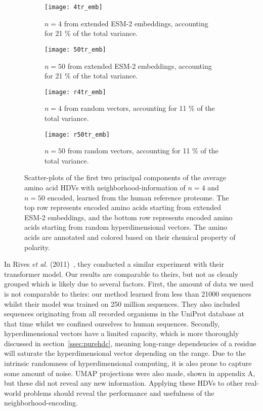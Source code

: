 \begin{figure}[H]
    \label{fig:bigfig}
    \centering
    \begin{subfigure}[b]{0.45\textwidth}
        \texttt{[image: 4tr\_emb]}
        \caption{$n = 4$ from extended ESM-2 embeddings, accounting for 21 \% of the total variance.}
        \label{fig:AAtr4}
    \end{subfigure}
    \hfill
    \begin{subfigure}[b]{0.45\textwidth}
        \texttt{[image: 50tr\_emb]}
        \caption{$n = 50$ from extended ESM-2 embeddings, accounting for 21 \% of the total variance.}
        \label{fig:AAtr50}
    \end{subfigure}
    \vspace{10pt} %
    \begin{subfigure}[b]{0.45\textwidth}
        \texttt{[image: r4tr\_emb]}
        \caption{$n = 4$ from random vectors, accounting for 11 \% of the total variance.}
        \label{fig:AArtr4}
    \end{subfigure}
    \hfill
    \begin{subfigure}[b]{0.45\textwidth}
        \texttt{[image: r50tr\_emb]}
        \caption{$n = 50$ from random vectors, accounting for 11 \% of the total variance.}
        \label{fig:AArtr50}
    \end{subfigure}
    \caption{Scatter-plots of the first two principal components of the average amino acid HDVs with neighborhood-information of $n = 4$ and $n = 50$ encoded, learned from the human reference proteome. The top row represents encoded amino acids starting from extended ESM-2 embeddings, and the bottom row represents encoded amino acids starting from random hyperdimensional vectors. The amino acids are annotated and colored based on their chemical property of polarity.}
\end{figure}

In Rives \textit{et al.} (2011)~\cite{esm1}, they conducted a similar experiment with their transformer model. Our results are comparable to theirs, but not as cleanly grouped which is likely due to several factors. First, the amount of data we used is not comparable to theirs: our method learned from less than 21000 sequences whilst their model was trained on 250 million sequences. They also included sequences originating from all recorded organisms in the UniProt database at that time whilst we confined ourselves to human sequences. Secondly, hyperdimensional vectors have a limited capacity, which is more thoroughly discussed in section~\ref{ssec:purehdc}, meaning long-range dependencies of a residue will saturate the hyperdimensional vector depending on the range. Due to the intrinsic randomness of hyperdimensional computing, it is also prone to capture some amount of noise. UMAP projections were also made, shown in appendix A, but these did not reveal any new information. Applying these HDVs to other real-world problems should reveal the performance and usefulness of the neighborhood-encoding.